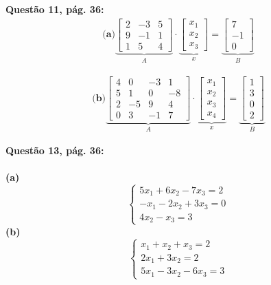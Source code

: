 \documentclass[a4paper,12pt]{article}
\begin{document}
\textbf{Questão 11, pág. 36:}\\
\begin{align*}
    \textbf{(a)}
    \underbrace{
    \begin{bmatrix}
        2 & -3 & 5\\
        9 & -1 & 1\\
        1 & 5 & 4
    \end{bmatrix}}_{A} 
    \cdot
    \underbrace{
    \begin{bmatrix}
        x_{1} \\
        x_{2} \\
        x_{3}
    \end{bmatrix}}_{x}
    =
    \underbrace{
    \begin{bmatrix}
        7 \\
        -1 \\
        0
    \end{bmatrix}}_{B}
\end{align*}

\begin{align*}
    \textbf{(b)}
    \underbrace{
    \begin{bmatrix}
        4 & 0 & -3 & 1\\
        5 & 1 & 0 & -8\\
        2 & -5 & 9 & 4\\
        0 & 3 & -1 & 7
    \end{bmatrix}}_{A} 
    \cdot
    \underbrace{
    \begin{bmatrix}
        x_{1} \\
        x_{2} \\
        x_{3} \\
        x_{4}
    \end{bmatrix}}_{x}
    =
    \underbrace{
    \begin{bmatrix}
        1 \\
        3 \\
        0 \\
        2
    \end{bmatrix}}_{B}
\end{align*}

\textbf{Questão 13, pág. 36:}\\ \\
\textbf{(a)}
\begin{equation*}
    \begin{cases*}
        5x_1 + 6x_2 - 7x_3 = 2 \\
        -x_1 - 2x_2 + 3x_3 = 0 \\
               4x_2 - x_ 3 = 3
    \end{cases*}
\end{equation*}
\textbf{(b)}
\begin{equation*}
    \begin{cases*}
         x_1 +  x_2 +  x_3 = 2 \\
        2x_1 + 3x_2        = 2 \\
        5x_1 - 3x_2 - 6x_3 = 3
    \end{cases*}
\end{equation*}
\end{document}
